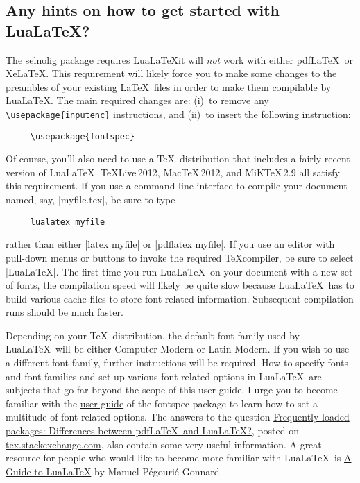 \documentclass[12pt]{article}
\newcommand{\pkg}[1]{\textsf{#1}}
\begin{document}
\subsection{Any hints on how to get started with Lua\LaTeX?}

The \pkg{selnolig} package requires Lua\LaTeX\textemdash it will \emph{not} work with either pdf\LaTeX\ or Xe\LaTeX. This requirement will likely force you to make some changes to the preambles of your existing \LaTeX\ files in order to make them compilable by Lua\LaTeX. The main required changes are: (i)~to remove any \Verb+\usepackage{inputenc}+ instructions, and (ii)~to insert the following instruction:
\begin{Verbatim}
     \usepackage{fontspec}
\end{Verbatim}

Of course, you'll also need to use a \TeX\ distribution that includes a fairly recent version of Lua\LaTeX. \TeX Live\,2012, Mac\TeX\,2012, and MiK\TeX\,2.9 all satisfy this requirement. If you use a command-line interface to compile your document named, say, |myfile.tex|, be sure to type 
\begin{Verbatim}
     lualatex myfile
\end{Verbatim}
rather than either |latex myfile| or |pdflatex myfile|. If you use an editor with pull-down menus or buttons to invoke the required \TeX compiler, be sure to select |LuaLaTeX|. The first time you run Lua\LaTeX\ on your document with a new set of fonts, the compilation speed will likely be quite slow because Lua\LaTeX\ has to build various cache files to store font-related information. Subsequent compilation runs should be much faster. 

Depending on your \TeX\ distribution, the default font family used by Lua\LaTeX\ will be either Computer Modern or Latin Modern. If you wish to use a different font family, further instructions will be required. How to specify fonts and font families and set up various font-related options in Lua\LaTeX\ are subjects that go far beyond the scope of this user guide. I urge you to become familiar with the \href{http://www.ctan.org/tex-archive/macros/latex/contrib/fontspec/fontspec.pdf}{user guide} of the \pkg{fontspec} package to learn how to set a multitude of font-related options. The answers to the question \href{http://tex.stackexchange.com/q/28642/5001}{Frequently loaded packages: Differences between pdf\LaTeX\ and Lua\LaTeX?}, posted on \href{http://tex.stackexchange.com/}{tex.s\breaklig tackexchange.com}, also contain some very useful information. A great resource for people who would like to become more familiar with Lua\LaTeX\ is  \href{http://mirror.ctan.org/info/luatex/lualatex-doc/lualatex-doc.pdf}{A Guide to Lua\LaTeX} by Manuel Pégourié-Gonnard.
\end{document}
